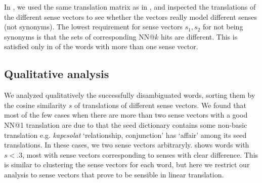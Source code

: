 \documentclass[11pt]{article}
\begin{document}
In \disamb, we used the same translation matrix as in \any, and inspected the
translations of the different sense vectors to see whether the vectors really
model different senses (not synonyms).
The lowest requirement for sense vectors $s_1, s_2$ for not being synonyms is
that the sets of corresponding NN@$k$ hits are different. This is satisfied
only in \todo{\%} of the words with more than one sense vector.

\subsection{Qualitative analysis}

We analyzed qualitatively the successfully disambiguated words, sorting them by
the cosine similarity $s$ of translations of different sense vectors. We found
that most of the few cases when there are more than two sense vectors with a
good NN@1 translation are due to that the seed dictionary contains some
non-basic translation e.g. \emph{kapcsolat} `relationship, conjunction' has
`affair' among its seed translations. In these cases, we two sense vectors
arbitraryly.  
shows words with $s<.3$, most with sense vectors corresponding to senses with
clear difference.  This is similar to clustering the sense vectors for each
word, but here we restrict our analysis to sense vectors that prove to be
sensible in linear translation.
\end{document}
